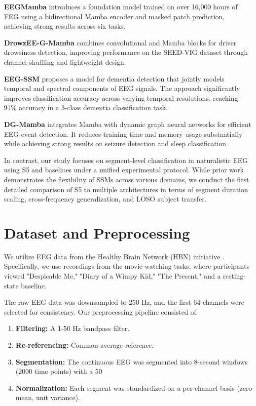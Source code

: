 \documentclass{article}
\begin{document}
\textbf{EEGMamba} \cite{wang2025eegmamba} introduces a foundation model trained on over 16,000 hours of EEG using a bidirectional Mamba encoder and masked patch prediction, achieving strong results across six tasks.

\textbf{DrowzEE-G-Mamba} \cite{siddhad2024drowzee} combines convolutional and Mamba blocks for driver drowsiness detection, improving performance on the SEED-VIG dataset through channel-shuffling and lightweight design.

\textbf{EEG-SSM} \cite{tran2024eegssm} proposes a model for dementia detection that jointly models temporal and spectral components of EEG signals. The approach significantly improves classification accuracy across varying temporal resolutions, reaching 91\% accuracy in a 3-class dementia classification task.

\textbf{DG-Mamba} \cite{li2025dgmamba} integrates Mamba with dynamic graph neural networks for efficient EEG event detection. It reduces training time and memory usage substantially while achieving strong results on seizure detection and sleep classification.

In contrast, our study focuses on segment-level classification in naturalistic EEG using S5 and baselines under a unified experimental protocol. While prior work demonstrates the flexibility of SSMs across various domains, we conduct the first detailed comparison of S5 to multiple architectures in terms of segment duration scaling, cross-frequency generalization, and LOSO subject transfer.


\section{Dataset and Preprocessing}
\label{sec:data}


We utilize EEG data from the Healthy Brain Network (HBN) initiative \cite{shirazi2024hbn}. Specifically, we use recordings from the movie-watching tasks, %
where participants viewed "Despicable Me," "Diary of a Wimpy Kid," "The Present," and a resting-state baseline.

The raw EEG data was downsampled to 250 Hz, and the first 64 channels were selected for consistency. Our preprocessing pipeline consisted of:
\begin{enumerate}
    \item \textbf{Filtering:} A 1-50 Hz bandpass filter.
    \item \textbf{Re-referencing:} Common average reference.
    \item \textbf{Segmentation:} The continuous EEG was segmented into 8-second windows (2000 time points) with a 50%
    \item \textbf{Normalization:} Each segment was standardized on a per-channel basis (zero mean, unit variance).
\end{enumerate}
\end{document}

